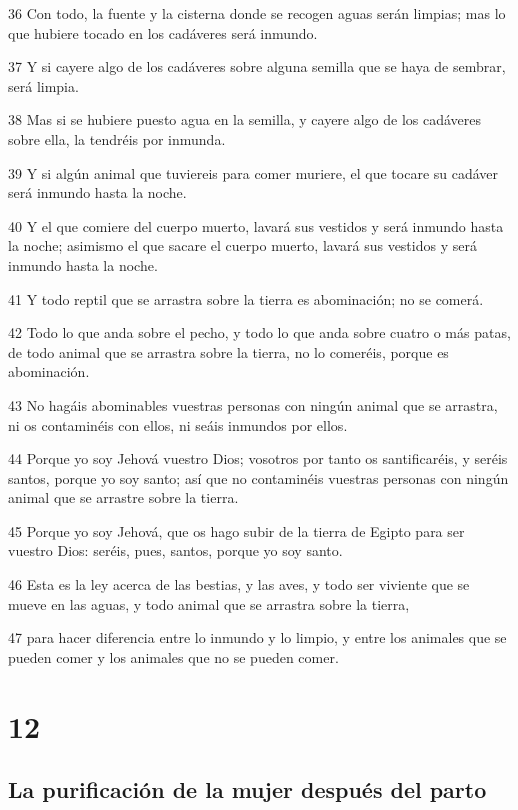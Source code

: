 \par 36 Con todo, la fuente y la cisterna donde se recogen aguas serán limpias; mas lo que hubiere tocado en los cadáveres será inmundo.
\par 37 Y si cayere algo de los cadáveres sobre alguna semilla que se haya de sembrar, será limpia.
\par 38 Mas si se hubiere puesto agua en la semilla, y cayere algo de los cadáveres sobre ella, la tendréis por inmunda.
\par 39 Y si algún animal que tuviereis para comer muriere, el que tocare su cadáver será inmundo hasta la noche.
\par 40 Y el que comiere del cuerpo muerto, lavará sus vestidos y será inmundo hasta la noche; asimismo el que sacare el cuerpo muerto, lavará sus vestidos y será inmundo hasta la noche.
\par 41 Y todo reptil que se arrastra sobre la tierra es abominación; no se comerá.
\par 42 Todo lo que anda sobre el pecho, y todo lo que anda sobre cuatro o más patas, de todo animal que se arrastra sobre la tierra, no lo comeréis, porque es abominación.
\par 43 No hagáis abominables vuestras personas con ningún animal que se arrastra, ni os contaminéis con ellos, ni seáis inmundos por ellos.
\par 44 Porque yo soy Jehová vuestro Dios; vosotros por tanto os santificaréis, y seréis santos, porque yo soy santo; así que no contaminéis vuestras personas con ningún animal que se arrastre sobre la tierra.
\par 45 Porque yo soy Jehová, que os hago subir de la tierra de Egipto para ser vuestro Dios: seréis, pues, santos, porque yo soy santo.
\par 46 Esta es la ley acerca de las bestias, y las aves, y todo ser viviente que se mueve en las aguas, y todo animal que se arrastra sobre la tierra,
\par 47 para hacer diferencia entre lo inmundo y lo limpio, y entre los animales que se pueden comer y los animales que no se pueden comer.

\chapter{12}

\section*{La purificación de la mujer después del parto}


